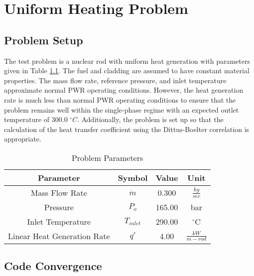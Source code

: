 \vspace*{-80mm}
\chapter{Uniform Heating Problem} \label{chapter5:uniform_heating1}
 
\section{Problem Setup}


The test problem is a nuclear rod with uniform heat generation with parameters
given in Table \ref{table:heating:parameters}. The fuel and cladding are assumed
to have constant material properties. The mass flow rate, reference pressure, and inlet
temperature approximate normal PWR operating conditions. However, the heat
generation rate is much less than normal PWR operating conditions to ensure that
the problem remains well  within the single-phase regime with an expected outlet
temperature of 300.0 $^{\circ}C$. Additionally, the problem is set up so that
the calculation of the heat transfer coefficient using the Dittus-Boelter
correlation is appropriate.

\begin{table}[h]
\center
\caption{Problem Parameters}
\label{table:heating:parameters}
\begin{tabular}{|c|c|c|c|}
\hline
Parameter		&	Symbol	&	Value	&	Unit	\\ \hline
Mass Flow Rate 	& $\dot{m}$ &   0.300   &   $\frac{kg}{sec}$  \\ \hline
Pressure		&	$P_{o}$	&	165.00	&	bar	\\ \hline
Inlet Temperature&$T_{inlet}$&	290.00	&	$^{\circ}$C	\\ \hline
Linear Heat Generation Rate& $q'$  & 4.00 & $\frac{kW}{m-rod}$ \\ \hline
\end{tabular}
\end{table}

\section{Code Convergence}




    














